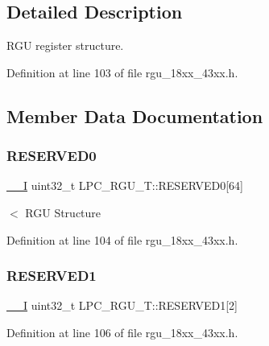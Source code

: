 \subsection{Detailed Description}
R\+GU register structure. 

Definition at line 103 of file rgu\+\_\+18xx\+\_\+43xx.\+h.



\subsection{Member Data Documentation}
\mbox{\label{struct_l_p_c___r_g_u___t_a1b4b0c64ae33729b8ec1d1d79ba373d4}} 
\subsubsection{\texorpdfstring{R\+E\+S\+E\+R\+V\+E\+D0}{RESERVED0}}
{\footnotesize\ttfamily \hyperlink{core__sc300_8h_af63697ed9952cc71e1225efe205f6cd3}{\+\_\+\+\_\+I} uint32\+\_\+t L\+P\+C\+\_\+\+R\+G\+U\+\_\+\+T\+::\+R\+E\+S\+E\+R\+V\+E\+D0\mbox{[}64\mbox{]}}

$<$ R\+GU Structure 

Definition at line 104 of file rgu\+\_\+18xx\+\_\+43xx.\+h.

\mbox{\label{struct_l_p_c___r_g_u___t_aba129ebadcbd52f7f25fca1eda91365c}} 
\subsubsection{\texorpdfstring{R\+E\+S\+E\+R\+V\+E\+D1}{RESERVED1}}
{\footnotesize\ttfamily \hyperlink{core__sc300_8h_af63697ed9952cc71e1225efe205f6cd3}{\+\_\+\+\_\+I} uint32\+\_\+t L\+P\+C\+\_\+\+R\+G\+U\+\_\+\+T\+::\+R\+E\+S\+E\+R\+V\+E\+D1\mbox{[}2\mbox{]}}



Definition at line 106 of file rgu\+\_\+18xx\+\_\+43xx.\+h.

